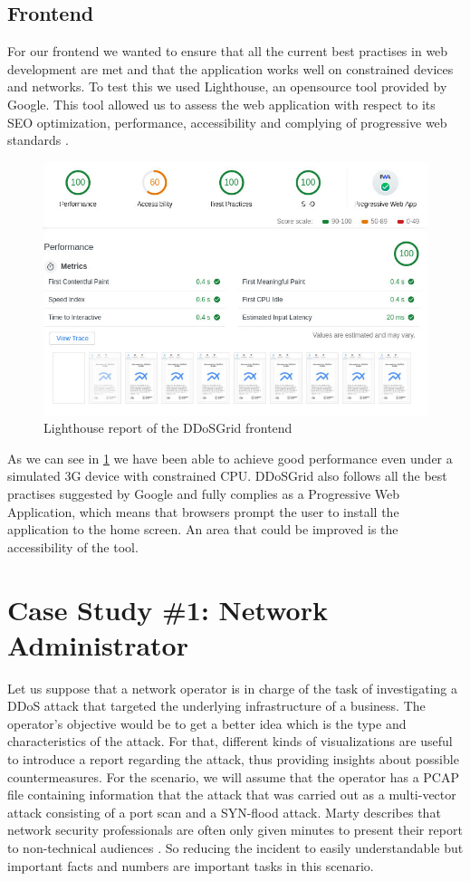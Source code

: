 \subsection{Frontend}\label{frontendevaluation}
For our frontend we wanted to ensure that all the current best practises in web development are met and that the application works well on constrained devices and networks. To test this we used Lighthouse, an opensource tool provided by Google. This tool allowed us to assess the web application with respect to its SEO optimization, performance, accessibility and complying of progressive web standards \cite{lighthouse}.
\begin{figure}
    \centering
    \includegraphics[width=12cm]{images/lighthouse.jpeg}
    \caption{Lighthouse report of the DDoSGrid frontend}
    \label{fig:lightouse}
\end{figure}
As we can see in \ref{fig:lightouse} we have been able to achieve good performance even under a simulated 3G device with constrained CPU. DDoSGrid also follows all the best practises suggested by Google and fully complies as a Progressive Web Application, which means that browsers prompt the user to install the application to the home screen. An area that could be improved is the accessibility of the tool.

\section{Case Study \#1: Network Administrator}
Let us suppose that a network operator is in charge of the task of investigating a DDoS attack that targeted the underlying infrastructure of a business. The operator's objective would be to get a better idea which is the type and characteristics of the attack. For that, different kinds of visualizations are useful to introduce a report regarding the attack, thus providing insights about possible countermeasures. For the scenario, we will assume that the operator has a PCAP file containing information that the attack that was carried out as a multi-vector attack consisting of a port scan and a SYN-flood attack. Marty describes that network security professionals are often only given minutes to present their report to non-technical audiences \cite{appliedsecurityvisualization}. So reducing the incident to easily understandable but important facts and numbers are important tasks in this scenario.

